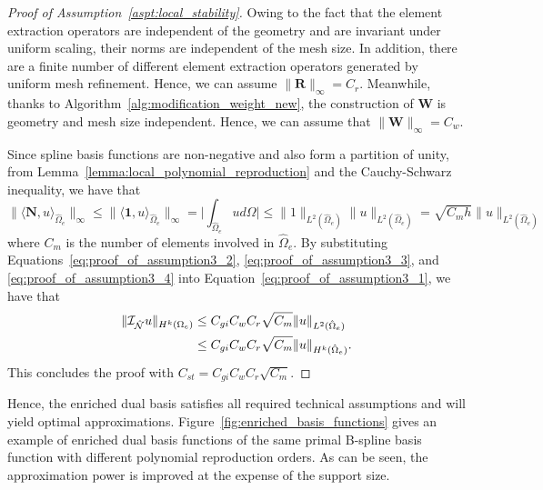 \begin{proof}[Proof of Assumption~\ref{aspt:local_stability}]
	Owing to the fact that the \Bezier element extraction operators are independent of the geometry and are invariant under uniform scaling, their norms are independent of the mesh size. In addition, there are a finite number of different \Bezier element extraction operators generated by uniform mesh refinement. Hence, we can assume $\|\mathbf{R}\|_\infty=C_r$. Meanwhile, thanks to Algorithm~\ref{alg:modification_weight_new}, the construction of $\mathbf{W}$ is geometry and mesh size independent. Hence, we can assume that $\|\mathbf{W}\|_\infty=C_w$.\par

	Since spline basis functions are non-negative and also form a partition of unity, from Lemma~\ref{lemma:local_polynomial_reproduction} and the Cauchy-Schwarz inequality, we have that
	\begin{equation}
		\| \langle {\mathbf{N},u} \rangle_{\hat{\Omega}_e} \|_\infty \leq \| \langle {\mathbf{1},u} \rangle_{\hat{\Omega}_e} \|_\infty = \vert \int_{\hat{\Omega}_e} u d\Omega \vert \leq \|1\|_{L^2(\hat{\Omega}_e)} \|u\|_{L^2(\hat{\Omega}_e)}=\sqrt{C_m h} \|u\|_{L^2(\hat{\Omega}_e)}\label{eq:proof_of_assumption3_4}
	\end{equation}
	where $C_m$ is the number of elements involved in $\hat{\Omega}_e$. By substituting Equations~\eqref{eq:proof_of_assumption3_2}, \eqref{eq:proof_of_assumption3_3}, and \eqref{eq:proof_of_assumption3_4} into Equation~\eqref{eq:proof_of_assumption3_1}, we have that
	\begin{equation}
		\begin{split}
			\| \mathcal{I}_{\hat{\mathcal{N}}}u \|_{H^k(\Omega_e)} &\leq C_{gi}C_wC_r \sqrt{C_m} \|u\|_{L^2(\hat{\Omega}_e)} \\
			&\leq C_{gi}C_wC_r\sqrt{C_m}\|u\|_{H^k(\hat{\Omega}_e)}.
		\end{split}
	\end{equation}
	This concludes the proof with $C_{st}=C_{gi}C_wC_r\sqrt{C_m}$.
\end{proof}
Hence, the enriched dual basis satisfies all required technical assumptions and will yield optimal approximations. Figure~\ref{fig:enriched_basis_functions} gives an example of enriched \Bezier dual basis functions of the same primal B-spline basis function with different polynomial reproduction orders. As can be seen, the approximation power is improved at the expense of the support size.

